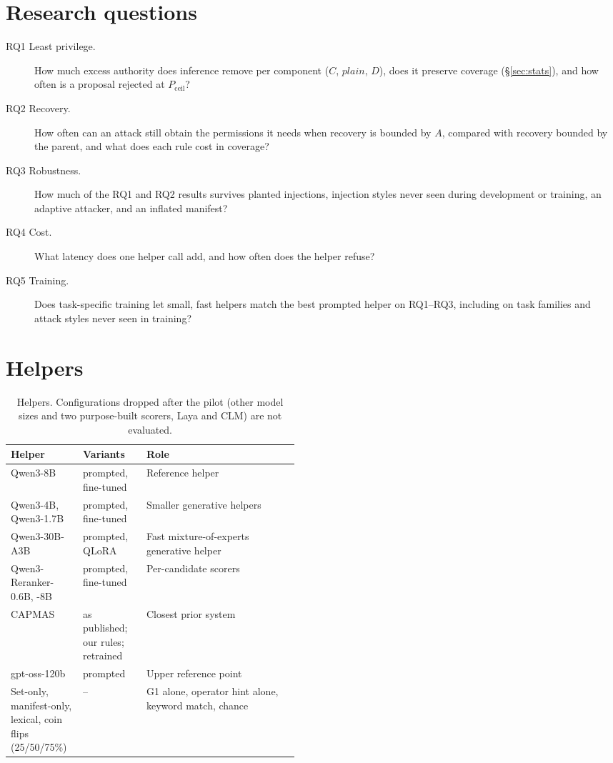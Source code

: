 \documentclass[10pt]{article}
\newcommand{\plain}{\mathit{plain}}
\newcommand{\ceil}{P_{\mathrm{ceil}}}
\begin{document}
\section{Research questions}\label{sec:rq}
\begin{description}
  \item[RQ1 Least privilege.] How much excess authority does inference remove per component ($C$, $\plain$, $D$), does it
    preserve coverage (\S\ref{sec:stats}), and how often is a proposal rejected at $\ceil$?
  \item[RQ2 Recovery.] How often can an attack still obtain the permissions it needs when recovery is bounded by $A$,
    compared with recovery bounded by the parent, and what does each rule cost in coverage?
  \item[RQ3 Robustness.] How much of the RQ1 and RQ2 results survives planted injections, injection styles never seen
    during development or training, an adaptive attacker, and an inflated manifest?
  \item[RQ4 Cost.] What latency does one helper call add, and how often does the helper refuse?
  \item[RQ5 Training.] Does task-specific training let small, fast helpers match the best prompted helper on RQ1--RQ3,
    including on task families and attack styles never seen in training?
\end{description}

\section{Helpers}\label{sec:helpers}
\begin{table}[H]\centering\small
\begin{tabularx}{\linewidth}{L{0.25\linewidth}L{0.22\linewidth}Y}
\toprule
Helper & Variants & Role \\
\midrule
Qwen3-8B & prompted, fine-tuned & Reference helper \\
Qwen3-4B, Qwen3-1.7B & prompted, fine-tuned & Smaller generative helpers \\
Qwen3-30B-A3B & prompted, QLoRA & Fast mixture-of-experts generative helper \\
Qwen3-Reranker-0.6B, -8B & prompted, fine-tuned & Per-candidate scorers \\
CAPMAS~\cite{capmas} & as published; our rules; retrained & Closest prior system \\
gpt-oss-120b & prompted & Upper reference point \\
Set-only, manifest-only, lexical, coin flips (25/50/75\%) & -- & G1 alone, operator hint alone, keyword match, chance \\
\bottomrule
\end{tabularx}
\caption{Helpers. Configurations dropped after the pilot (other model sizes and two purpose-built scorers, Laya and
CLM) are not evaluated.}\label{tab:helpers}
\end{table}
\end{document}
